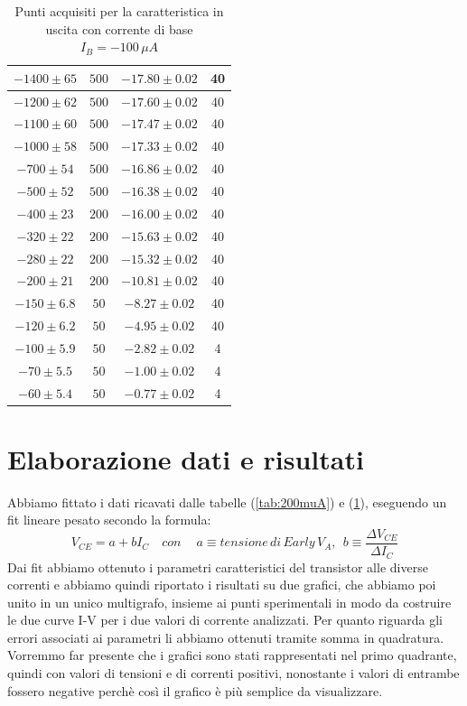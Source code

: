 \documentclass[]{article}
\begin{document}
\begin{table}[H]
\begin{tabular}{|c|c|c|c|}
		\hline
		$ -1400\pm 65 $ &$ 500 $ & $ -17.80\pm 0.02 $ &40 \\
		\hline
		$ -1200\pm 62 $ &$ 500 $ & $ -17.60\pm 0.02 $ &40 \\
		\hline
		$ -1100\pm 60 $ &$ 500 $ & $ -17.47\pm 0.02 $ &40 \\
		\hline
		$ -1000\pm 58 $ &$ 500 $ & $ -17.33\pm 0.02 $ &40 \\
		\hline
		$ -700\pm 54 $ &$ 500 $ & $ -16.86\pm 0.02 $ &40 \\
		\hline
		$ -500\pm 52 $ &$ 500 $ & $ -16.38\pm 0.02 $ &40 \\
		\hline
		$ -400\pm 23 $ &$ 200 $ & $ -16.00\pm 0.02 $ &40 \\
		\hline
		$ -320\pm 22 $ &$ 200 $ & $-15.63\pm 0.02 $ &40 \\
		\hline
		$-280\pm 22 $ &$ 200 $ & $ -15.32\pm 0.02 $ &40 \\
		\hline
		$ -200\pm 21 $ &$ 200 $ & $ -10.81\pm 0.02 $ &40 \\
		\hline
		$ -150\pm 6.8 $ &$ 50 $ & $ -8.27\pm 0.02 $ &40 \\
		\hline
		$ -120\pm 6.2 $ &$ 50 $ & $ -4.95\pm 0.02 $ &40 \\
		\hline
		$ -100\pm 5.9 $ &$ 50 $ & $ -2.82\pm 0.02 $ &4 \\
		\hline
		$ -70\pm 5.5 $ &$ 50 $ & $ -1.00\pm 0.02 $ &4 \\
		\hline
		$ -60\pm 5.4 $ &$ 50 $ & $ -0.77\pm 0.02 $ &4 \\
		\hline
	\end{tabular}
\caption{Punti acquisiti per la caratteristica in uscita con corrente di base $ I_{B}= -100\, \mu A $}
\label{tab:100muA}
\end{table}
\section{Elaborazione dati e risultati}

Abbiamo fittato i dati ricavati dalle tabelle (\ref{tab:200muA}) e (\ref{tab:100muA}), eseguendo un fit lineare pesato secondo la formula: 
\begin{equation}
	V_{CE}=a+bI_{C} \quad con\quad \:a\equiv tensione\, di\, Early \,V_{A},\:\: b\equiv\frac{\Delta V_{CE}}{\Delta I_{C}}
	\label{fitlin}
\end{equation}
Dai fit abbiamo ottenuto i parametri caratteristici del transistor alle diverse correnti e abbiamo quindi riportato i risultati su due grafici, che abbiamo poi unito in un unico multigrafo, insieme ai punti sperimentali in modo da costruire le due curve I-V per i due valori di corrente analizzati. Per quanto riguarda gli errori associati ai parametri li abbiamo ottenuti tramite somma in quadratura. Vorremmo far presente che i grafici sono stati rappresentati nel primo quadrante, quindi con valori di tensioni e di correnti positivi, nonostante i valori di entrambe fossero negative perchè così il grafico è più semplice da visualizzare.
\end{document}
